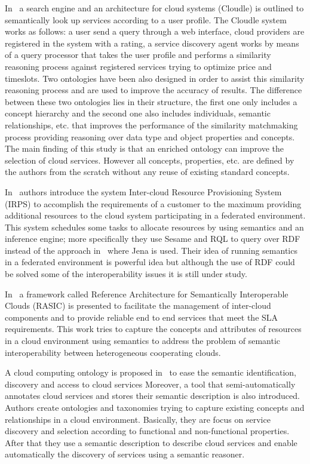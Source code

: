 In~\cite{cloudle} a search engine and an architecture for cloud systems (Cloudle) is 
outlined to semantically look up services according to a user profile. The 
Cloudle system works as follows: a user send a query through a web interface, 
cloud providers are registered in the system with a rating, a service discovery 
agent works by means of a query processor that takes the user profile and 
performs a similarity reasoning process against registered services trying to 
optimize price and timeslots. Two ontologies have been also designed in order to 
assist this similarity reasoning process and are used to improve the accuracy of 
results. The difference between these two ontologies lies in their structure, 
the first one only includes a concept hierarchy and the second one also includes 
individuals, semantic relationships, etc. that improves the performance of the 
similarity matchmaking process providing reasoning over data type and object 
properties and concepts. The main finding of this study is that an enriched 
ontology can improve the selection of cloud services. However all concepts, 
properties, etc. are defined by the authors from the scratch without any reuse 
of existing standard concepts.

In~\cite{6206823} authors introduce the system Inter-cloud Resource Provisioning System 
(IRPS) to accomplish the requirements of a customer to the maximum providing 
additional resources to the cloud system participating in a federated 
environment. This system schedules some tasks to allocate resources by using 
semantics and an inference engine; more specifically they use Sesame and RQL to 
query over RDF instead of the approach in~\cite{Ejarque:2008:USR:1443230.1444322} where Jena is used. Their idea of 
running semantics in a federated environment is powerful idea but although the 
use of RDF could be solved some of the interoperability issues it is still under 
study.


In~\cite{Buyya:2010:IUF:2143583.2143586} a framework called Reference Architecture for Semantically Interoperable 
Clouds (RASIC) is presented to facilitate the management of inter-cloud 
components and to provide reliable end to end services that meet the SLA 
requirements. This work tries to capture the concepts and attributes of 
resources in a cloud environment using semantics to address the problem of 
semantic interoperability between heterogeneous cooperating clouds.


A cloud computing ontology is proposed in~\cite{secloud12} to ease the semantic 
identification, discovery and access to cloud services Moreover, a tool that 
semi-automatically annotates cloud services and stores their semantic 
description is also introduced. Authors create ontologies and taxonomies trying 
to capture existing concepts and relationships in a cloud environment. 
Basically, they are focus on service discovery and selection according to 
functional and non-functional properties. After that they use a semantic 
description to describe cloud services and enable automatically the discovery of 
services using a semantic reasoner.

